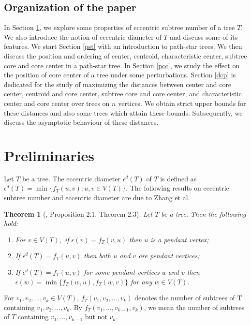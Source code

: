 \documentclass[10pt,a4paper]{amsart}
\newtheorem{theorem}{Theorem}[section]
\begin{document}
\subsection{Organization of the paper}

In Section \ref{Prim}, we explore some properties of eccentric subtree number of a tree  $T$. We also introduce the notion of eccentric diameter of $T$ and discuss some of its features. We start Section \ref{pst} with an introduction to path-star trees. We then discuss the position and ordering of center, centroid, characteristic center, subtree core and core center in a path-star tree. In Section \ref{pcc}, we study the effect on the position of core center of a tree under some perturbations. Section \ref{dcp} is dedicated for the study of maximizing the distances between center and core center, centroid and core center, subtree core and core center, and characteristic center and core center over trees on $n$ vertices. We obtain strict upper bounds for these distances and also some trees which attain these bounds. Subsequently, we discuss the asymptotic behaviour of these distances.

\section{Preliminaries}\label{Prim}

Let $T$ be a tree. The eccentric diameter $\epsilon^d(T)$ of $T$ is defined as $\epsilon^d(T)=\min\{f_T(u,v): u, v\in V(T)\}$. The following results on eccentric subtree number and eccentric diameter are due to Zhang et al.

\begin{theorem}[\cite{Zhang}, Proposition 2.1, Theorem 2.3]\label{zha1}
Let $T$ be a tree. Then the following hold:
\begin{enumerate}
\item[(i)] For $v\in V(T),$ if $\epsilon(v)= f_T(v,u)$ then $u$ is a pendant vertex;
\item[(ii)] If $\epsilon^d(T)=f_T(u,v)$ then both $u$ and $v$ are pendant vertices;
\item[(iii)] If $\epsilon^d(T)=f_T(u,v)$ for some pendant vertices $u$ and $v$ then $\epsilon(w)=\min\{f_T(w,u), f_T(w,v)\}$ for any $w\in V(T)$.
\end{enumerate}
\end{theorem}
For $v_1,v_2,\ldots,v_k\in V(T)$, $f_T(v_1,v_2,\ldots,v_k)$ denotes the number of subtrees of T containing $v_1,v_2,\ldots,v_k$. By $f_T(v_1,\ldots,v_{k-1},\overline{v_k})$, we mean the number of subtrees of $T$ containing $v_1,\ldots,v_{k-1}$ but not $v_k$.
\end{document}
